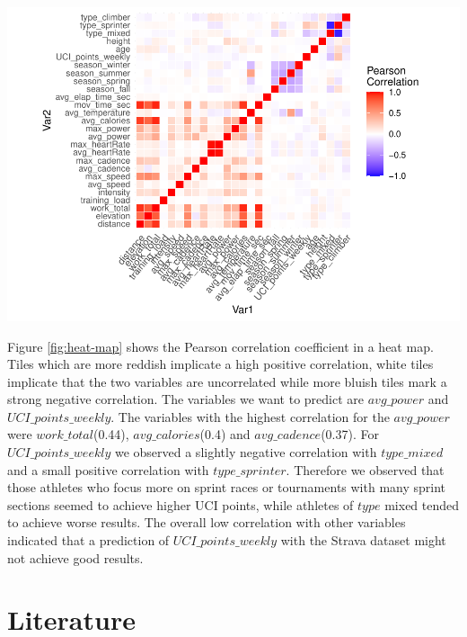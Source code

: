 \documentclass[12pt,a4paper]{article}
\let\origfigure\figure
\let\endorigfigure\endfigure
\renewenvironment{figure}[1][2] {
    \expandafter\origfigure\expandafter[H]
} {
    \endorigfigure
}
\begin{document}
\begin{figure}[!H]
\includegraphics{Master_Thesis_files/figure-latex/heat-map-1} \caption{Heat map for the dataset with average power and dropped NA values.}\label{fig:heat-map}
\end{figure}

Figure \ref{fig:heat-map} shows the Pearson correlation coefficient in a heat map. Tiles which are more reddish implicate a high positive correlation, white tiles implicate that the two variables are uncorrelated while more bluish tiles mark a strong negative correlation. The variables we want to predict are \(avg\_power\) and \(UCI\_points\_weekly\). The variables with the highest correlation for the \(avg\_power\) were \(work\_total\)(0.44), \(avg\_calories\)(0.4) and \(avg\_cadence\)(0.37). For \(UCI\_points\_weekly\) we observed a slightly negative correlation with \(type\_mixed\) and a small positive correlation with \(type\_sprinter\). Therefore we observed that those athletes who focus more on sprint races or tournaments with many sprint sections seemed to achieve higher UCI points, while athletes of \(type\) mixed tended to achieve worse results. The overall low correlation with other variables indicated that a prediction of \(UCI\_points\_weekly\) with the Strava dataset might not achieve good results.

\hypertarget{literature}{%
\section{Literature}\label{literature}}
\end{document}
